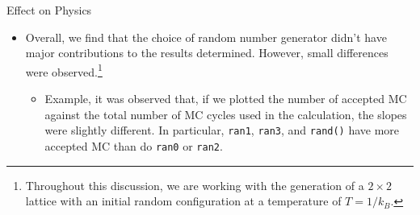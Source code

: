 \documentclass{beamer} %
\begin{document}
\begin{frame}{Effect on Physics}
\begin{itemize}
\item Overall, we find that the choice of random number generator didn't have major contributions to the results determined.  However, small differences were observed.\footnote{Throughout this discussion, we are working with the generation of a $2\times2$ lattice with an initial random configuration at a temperature of $T=1/k_{B}$.} 
\begin{itemize}
\item Example, it was observed that, if we plotted the number of accepted MC against the total number of MC cycles used in the calculation, the slopes were slightly different.   In particular, \texttt{ran1}, \texttt{ran3}, and \texttt{rand()} have more accepted MC than do \texttt{ran0} or \texttt{ran2}.  
\end{itemize}
\end{itemize}
\end{frame}
\end{document}
